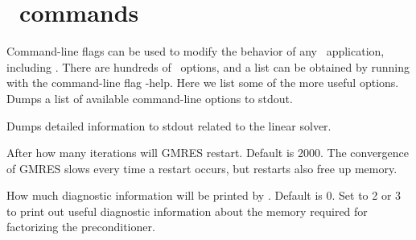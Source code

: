 \section{\PETSc~commands}

Command-line flags can be used to modify the behavior of any \PETSc~application, including \sfincs.
There are hundreds of \PETSc~options, and a list can be obtained by running with the command-line flag
{\ttfamily -help}. Here we list some of the more useful options.\\

{Dumps a list of available command-line options to stdout.}

\myhrule

{Dumps detailed information to stdout related to the linear solver.}

\myhrule

{After how many iterations will GMRES restart. Default is 2000. The convergence of GMRES slows every time a restart occurs, but restarts also free up memory.}

\myhrule

{How much diagnostic information will be printed by \mumps. Default is 0. Set to 2 or 3 to print out useful diagnostic information about the memory required for factorizing the preconditioner.}


